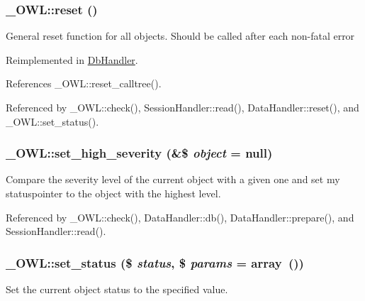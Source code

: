 \subsubsection[{reset}]{\setlength{\rightskip}{0pt plus 5cm}\_\-OWL::reset ()}\label{class__OWL_a2f2a042bcf31965194c03033df0edc9b}
General reset function for all objects. Should be called after each non-\/fatal error 

Reimplemented in \hyperlink{classDbHandler_a9982df4830f05803935bb31bac7fae3d}{DbHandler}.



References \_\-OWL::reset\_\-calltree().



Referenced by \_\-OWL::check(), SessionHandler::read(), DataHandler::reset(), and \_\-OWL::set\_\-status().

\subsubsection[{set\_\-high\_\-severity}]{\setlength{\rightskip}{0pt plus 5cm}\_\-OWL::set\_\-high\_\-severity (\&\$ {\em object} = {\ttfamily null})}\label{class__OWL_a576829692a3b66e3d518853bf43abae3}
Compare the severity level of the current object with a given one and set my statuspointer to the object with the highest level. 

Referenced by \_\-OWL::check(), DataHandler::db(), DataHandler::prepare(), and SessionHandler::read().

\subsubsection[{set\_\-status}]{\setlength{\rightskip}{0pt plus 5cm}\_\-OWL::set\_\-status (\$ {\em status}, \/  \$ {\em params} = {\ttfamily array~()})}\label{class__OWL_aea912d0ede9b3c2a69b79072d94d4787}
Set the current object status to the specified value.


